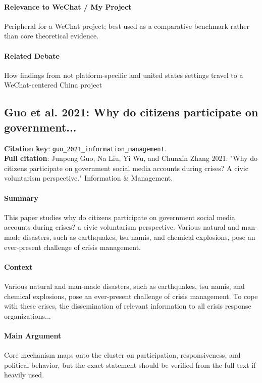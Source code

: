 \documentclass[12pt]{article}
\begin{document}
\paragraph{Relevance to WeChat / My Project} Peripheral for a WeChat project; best used as a comparative benchmark rather than core theoretical evidence.

\paragraph{Related Debate} How findings from not platform-specific and united states settings travel to a WeChat-centered China project


\subsection{Guo et al. 2021: Why do citizens participate on government...}
\textbf{Citation key}: \texttt{guo\_2021\_information\_management}.\\
\textbf{Full citation}: Junpeng Guo, Na Liu, Yi Wu, and Chunxin Zhang 2021. "Why do citizens participate on government social media accounts during crises? A civic voluntarism perspective." Information \& Management.

\paragraph{Summary} This paper studies why do citizens participate on government social media accounts during crises? a civic voluntarism perspective. Various natural and man-made disasters, such as earthquakes, tsu namis, and chemical explosions, pose an ever-present challenge of crisis management.

\paragraph{Context} Various natural and man-made disasters, such as earthquakes, tsu namis, and chemical explosions, pose an ever-present challenge of crisis management. To cope with these crises, the dissemination of relevant information to all crisis response organizations...

\paragraph{Main Argument} Core mechanism maps onto the cluster on participation, responsiveness, and political behavior, but the exact statement should be verified from the full text if heavily used.
\end{document}
